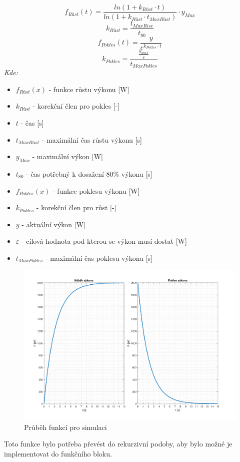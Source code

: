 \begin{equation}
    f_{Růst}(t) = \frac{ln(1 + k_{Růst} \cdot t)}{ln(1 + k_{Růst} \cdot t_{MaxRůst})} \cdot y_{Max}
    \label{eq:funkce_rust}
\end{equation} 
\begin{equation}
    k_{Růst} = \frac{t_{MaxRise}}{t_{80}}
    \label{eq:k_rust}
\end{equation}
\begin{equation}
    f_{Pokles}(t) = \frac{y}{e^{k_{Pokles} \cdot t}}
    \label{eq:funkce_pokles}
\end{equation}
\begin{equation}
    k_{Pokles} = \frac{\frac{y_{max}}{\varepsilon}}{t_{MaxPokles}}
    \label{eq:k_pokles}
\end{equation}
\newpage
\noindent\textit{Kde:}
\begin{itemize}
    \item $f_{Růst}(x)$ - funkce růstu výkonu [W]
    \item $k_{Růst}$ - korekční člen pro pokles [-]
    \item $t$ - čas [s]
    \item $t_{MaxRůst}$ - maximální čas růstu výkonu [s]
    \item $y_{Max}$ - maximální výkon [W]
    \item $t_{80}$ - čas potřebný k dosažení 80\% výkonu [s]
    \item $f_{Pokles}(x)$ - funkce poklesu výkonu [W]
    \item $k_{Pokles}$ - korekční člen pro růst [-] 
    \item $y$ - aktuální výkon [W]
    \item $\varepsilon$ - cílová hodnota pod kterou se výkon musí dostat [W]
    \item $t_{MaxPokles}$ - maximální čas poklesu výkonu [s]
\end{itemize}
\begin{figure}[!ht]
    \begin{center}
        \includegraphics[scale=0.52]{obrazky/simulace_funkce.pdf}
    \end{center}
    \caption[Průběh funkcí pro simulaci]{Průběh funkcí pro simulaci}
    \label{fig:simulace_funkce}
\end{figure}
\noindent Toto funkce bylo potřeba převést do rekurzivní podoby, aby bylo možné je implementovat do funkčního bloku.

